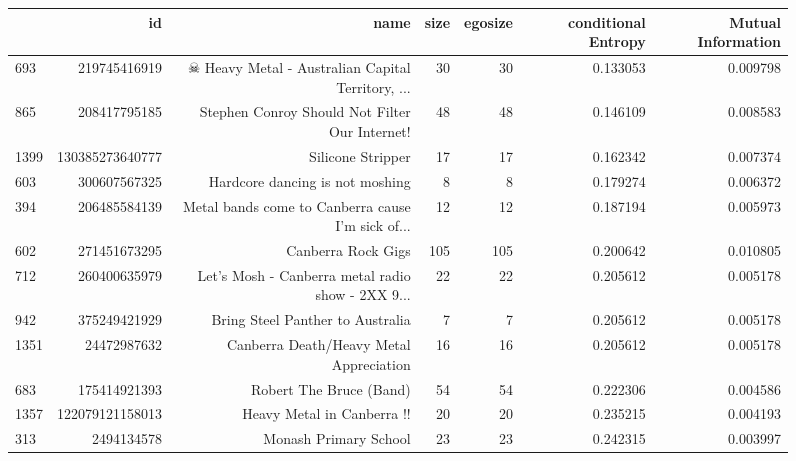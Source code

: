 \documentclass[letterpaper]{article}
\begin{document}
\begin{figure}
\cleardoublepage
\begin{table}
\begin{tabular}{| >{\small}l | >{\small}r | >{\small}r | >{\small}r | >{\small}r | >{\small}r |>{\small}r |}
\hline
{} &               id &                                               name &  size &  egosize &  conditional Entropy &  Mutual Information \\
\hline
693  &     219745416919 &  ☠ Heavy Metal - Australian Capital Territory, ... &    30 &       30 &             0.133053 &            0.009798 \\
865  &     208417795185 &     Stephen Conroy Should Not Filter Our Internet! &    48 &       48 &             0.146109 &            0.008583 \\
1399 &  130385273640777 &                                  Silicone Stripper &    17 &       17 &             0.162342 &            0.007374 \\
603  &     300607567325 &                    Hardcore dancing is not moshing &     8 &        8 &             0.179274 &            0.006372 \\
394  &     206485584139 &  Metal bands come to Canberra cause I'm sick of... &    12 &       12 &             0.187194 &            0.005973 \\
602  &     271451673295 &                                 Canberra Rock Gigs &   105 &      105 &             0.200642 &            0.010805 \\
712  &     260400635979 &  Let's Mosh - Canberra metal radio show - 2XX 9... &    22 &       22 &             0.205612 &            0.005178 \\
942  &     375249421929 &                   Bring Steel Panther to Australia &     7 &        7 &             0.205612 &            0.005178 \\
1351 &      24472987632 &            Canberra Death/Heavy Metal Appreciation &    16 &       16 &             0.205612 &            0.005178 \\
683  &     175414921393 &                            Robert The Bruce (Band) &    54 &       54 &             0.222306 &            0.004586 \\
1357 &  122079121158013 &                         Heavy Metal in Canberra !! &    20 &       20 &             0.235215 &            0.004193 \\
313  &       2494134578 &                              Monash Primary School &    23 &       23 &             0.242315 &            0.003997 \\

\end{tabular}
\end{table}
\end{figure}
\end{document}

